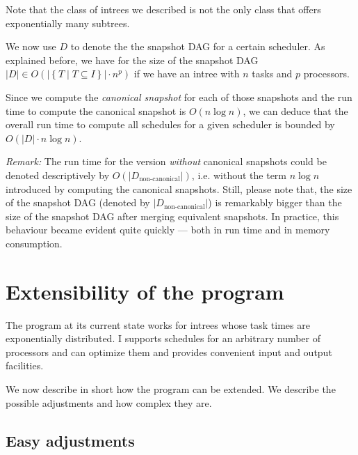 Note that the class of intrees we described is not the only class that offers exponentially many subtrees.

We now use $D$ to denote the the snapshot DAG for a certain scheduler. As explained before, we have for the size of the snapshot DAG $|D|\in O\left(|\left\{ T \mid T\subseteq I \right\}|\cdot n^p\right)$ if we have an intree with $n$ tasks and $p$ processors.

Since we compute the \emph{canonical snapshot} for each of those snapshots and the run time to compute the canonical snapshot is $O(n \log n)$, we can deduce that the overall run time to compute all schedules for a given scheduler is bounded by $O(|D| \cdot n \log n)$.

\emph{Remark:} The run time for the version \emph{without} canonical snapshots could be denoted descriptively by $O(|D_{\text{non-canonical}}|)$, i.e. without the term $n\log n$ introduced by computing the canonical snapshots. Still, please note that, the size of the snapshot DAG (denoted by $|D_{\text{non-canonical}}|$) is remarkably bigger than the size of the snapshot DAG after merging equivalent snapshots. In practice, this behaviour became evident quite quickly --- both in run time and in memory consumption.

\section{Extensibility of the program}
\label{sec:implementation-extending-program}

The program at its current state works for intrees whose task times are exponentially distributed. I supports schedules for an arbitrary number of processors and can optimize them and provides convenient input and output facilities.

We now describe in short how the program can be extended. We describe the possible adjustments and how complex they are.

\subsection{Easy adjustments}
\label{sec:implementation-extensions-easy}

